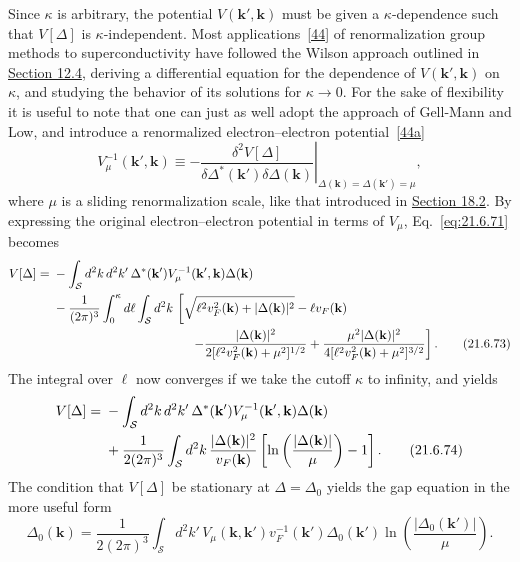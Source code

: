 Since $\kappa$ is arbitrary, the potential $V(\mathbf k',\mathbf k)$ must be given a $\kappa$-dependence such that $V[\Delta]$ is $\kappa$-independent. Most applications~\hyperref[ch21-ref-44]{[44]} of renormalization group methods to superconductivity have followed the Wilson approach outlined in \hyperref[sec:12.4]{Section 12.4}, deriving a differential equation for the dependence of $V(\mathbf k',\mathbf k)$ on $\kappa$, and studying the behavior of its solutions for $\kappa\to0$. For the sake of flexibility it is useful to note that one can just as well adopt the approach of Gell-Mann and Low, and introduce a renormalized electron--electron potential~\hyperref[ch21-ref-44a]{[44a]}
\begin{equation}
V_\mu^{-1}(\mathbf k',\mathbf k)
\equiv-
\left.
\frac{\delta^2V[\Delta]}
{\delta\Delta^*(\mathbf k')\delta\Delta(\mathbf k)}
\right|_{\Delta(\mathbf k)=\Delta(\mathbf k')=\mu},
\tag{21.6.72}\label{eq:21.6.72}
\end{equation}
where $\mu$ is a sliding renormalization scale, like that introduced in \hyperref[sec:18.2]{Section 18.2}. By expressing the original electron--electron potential in terms of $V_\mu$, Eq.~\eqref{eq:21.6.71} becomes
\begin{align}
V[\Delta]
={}&-\int_{\mathcal S}d^2k\,d^2k'\,
\Delta^*(\mathbf k')V_\mu^{-1}(\mathbf k',\mathbf k)\Delta(\mathbf k)
\notag\\
&-\frac{1}{(2\pi)^3}\int_0^\kappa d\ell
\int_{\mathcal S}d^2k\,
\left[
\sqrt{\ell^2v_F^2(\mathbf k)+|\Delta(\mathbf k)|^2}
-\ell v_F(\mathbf k)
\right.
\notag\\
&\hspace{11em}\left.
-\frac{|\Delta(\mathbf k)|^2}
{2[\ell^2v_F^2(\mathbf k)+\mu^2]^{1/2}}
+\frac{\mu^2|\Delta(\mathbf k)|^2}
{4[\ell^2v_F^2(\mathbf k)+\mu^2]^{3/2}}
\right].
\tag{21.6.73}\label{eq:21.6.73}
\end{align}
The integral over $\ell$ now converges if we take the cutoff $\kappa$ to infinity, and yields
\begin{align}
V[\Delta]
={}&-\int_{\mathcal S}d^2k\,d^2k'\,
\Delta^*(\mathbf k')V_\mu^{-1}(\mathbf k',\mathbf k)\Delta(\mathbf k)
\notag\\
&+\frac{1}{2(2\pi)^3}\int_{\mathcal S}d^2k\,
\frac{|\Delta(\mathbf k)|^2}{v_F(\mathbf k)}
\left[
\ln\left(\frac{|\Delta(\mathbf k)|}{\mu}\right)-1
\right].
\tag{21.6.74}\label{eq:21.6.74}
\end{align}
The condition that $V[\Delta]$ be stationary at $\Delta=\Delta_0$ yields the gap equation in the more useful form
\begin{equation}
\Delta_0(\mathbf k)
=\frac{1}{2(2\pi)^3}
\int_{\mathcal S}d^2k'\,
V_\mu(\mathbf k,\mathbf k')v_F^{-1}(\mathbf k')
\Delta_0(\mathbf k')
\ln\left(\frac{|\Delta_0(\mathbf k')|}{\mu}\right).
\tag{21.6.75}\label{eq:21.6.75}
\end{equation}

